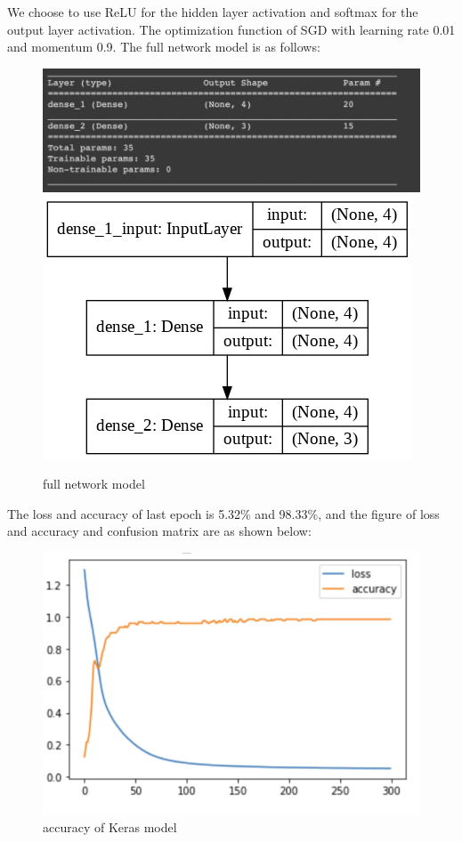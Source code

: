 \documentclass{article}
\begin{document}
We choose to use ReLU  for the hidden layer activation and softmax for the output layer activation. The optimization function of SGD with learning rate 0.01 and momentum 0.9. The full network model is as follows:
\begin{figure}[H]
	\centering
	\includegraphics[scale=0.2]{./img/model.png}
	\includegraphics[scale=0.3]{./img/model_plot.png}
	\caption{full network model}
\end{figure}
\noindent
The loss and accuracy of last epoch is 5.32\% and 98.33\%, and the figure of loss and accuracy and confusion matrix are as shown below:

\begin{figure}[H]
\centering
\includegraphics[scale=0.5]{./img/accuracy.png}
\caption{accuracy of Keras model}
\end{figure}
\end{document}

